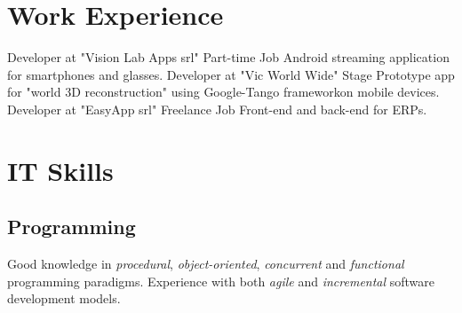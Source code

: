 \documentclass[letterpaper]{twentysecondcv} %
\begin{document}


\section{Work Experience}

\begin{twenty} %
		{Developer at "Vision Lab Apps srl"\footnotemarkA[4]}	{Part-time Job}
		{Android streaming application for smartphones and glasses.}
		{Developer at "Vic World Wide"\footnotemarkA[5]}	{Stage}
		{Prototype app for "world 3D reconstruction" using Google-Tango framework\footnotemarkA[6] on mobile devices.}
		{Developer at "EasyApp srl"\footnotemarkA[7]}	{Freelance Job}
		{Front-end and back-end  for ERPs.}
\end{twenty}




\section{IT Skills}

\subsection{Programming}

Good knowledge in \textit{procedural}, \textit{object-oriented}, \textit{concurrent} and \textit{functional} programming paradigms.
Experience with both \textit{agile} and \textit{incremental} software development models.
\end{document}
